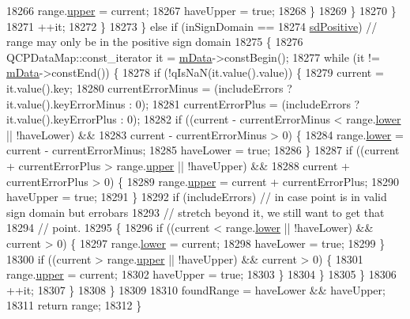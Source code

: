 \begin{DoxyCode}
18266             range.\hyperlink{class_q_c_p_range_ae44eb3aafe1d0e2ed34b499b6d2e074f}{upper} = current;
18267             haveUpper = \textcolor{keyword}{true};
18268           \}
18269         \}
18270       \}
18271       ++it;
18272     \}
18273   \} \textcolor{keywordflow}{else} \textcolor{keywordflow}{if} (inSignDomain ==
18274              \hyperlink{class_q_c_p_abstract_plottable_a661743478a1d3c09d28ec2711d7653d8a02951859f243a4d24e779cfbb5471030}{sdPositive}) \textcolor{comment}{// range may only be in the positive sign domain}
18275   \{
18276     QCPDataMap::const\_iterator it = \hyperlink{class_q_c_p_graph_a8457c840f69a0ac49f61d30a509c5d08}{mData}->constBegin();
18277     \textcolor{keywordflow}{while} (it != \hyperlink{class_q_c_p_graph_a8457c840f69a0ac49f61d30a509c5d08}{mData}->constEnd()) \{
18278       \textcolor{keywordflow}{if} (!qIsNaN(it.value().value)) \{
18279         current = it.value().key;
18280         currentErrorMinus = (includeErrors ? it.value().keyErrorMinus : 0);
18281         currentErrorPlus = (includeErrors ? it.value().keyErrorPlus : 0);
18282         \textcolor{keywordflow}{if} ((current - currentErrorMinus < range.\hyperlink{class_q_c_p_range_aa3aca3edb14f7ca0c85d912647b91745}{lower} || !haveLower) &&
18283             current - currentErrorMinus > 0) \{
18284           range.\hyperlink{class_q_c_p_range_aa3aca3edb14f7ca0c85d912647b91745}{lower} = current - currentErrorMinus;
18285           haveLower = \textcolor{keyword}{true};
18286         \}
18287         \textcolor{keywordflow}{if} ((current + currentErrorPlus > range.\hyperlink{class_q_c_p_range_ae44eb3aafe1d0e2ed34b499b6d2e074f}{upper} || !haveUpper) &&
18288             current + currentErrorPlus > 0) \{
18289           range.\hyperlink{class_q_c_p_range_ae44eb3aafe1d0e2ed34b499b6d2e074f}{upper} = current + currentErrorPlus;
18290           haveUpper = \textcolor{keyword}{true};
18291         \}
18292         \textcolor{keywordflow}{if} (includeErrors) \textcolor{comment}{// in case point is in valid sign domain but errobars}
18293                            \textcolor{comment}{// stretch beyond it, we still want to get that}
18294                            \textcolor{comment}{// point.}
18295         \{
18296           \textcolor{keywordflow}{if} ((current < range.\hyperlink{class_q_c_p_range_aa3aca3edb14f7ca0c85d912647b91745}{lower} || !haveLower) && current > 0) \{
18297             range.\hyperlink{class_q_c_p_range_aa3aca3edb14f7ca0c85d912647b91745}{lower} = current;
18298             haveLower = \textcolor{keyword}{true};
18299           \}
18300           \textcolor{keywordflow}{if} ((current > range.\hyperlink{class_q_c_p_range_ae44eb3aafe1d0e2ed34b499b6d2e074f}{upper} || !haveUpper) && current > 0) \{
18301             range.\hyperlink{class_q_c_p_range_ae44eb3aafe1d0e2ed34b499b6d2e074f}{upper} = current;
18302             haveUpper = \textcolor{keyword}{true};
18303           \}
18304         \}
18305       \}
18306       ++it;
18307     \}
18308   \}
18309 
18310   foundRange = haveLower && haveUpper;
18311   \textcolor{keywordflow}{return} range;
18312 \}
\end{DoxyCode}

